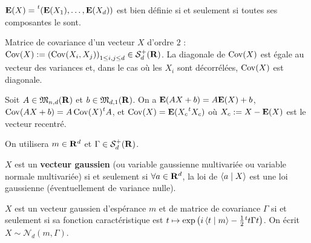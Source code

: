\begin{defn}
	$\esp(X) = \transp{(\esp(X_1),\ldots,\esp(X_d))}$ est bien définie si et seulement si toutes ses composantes le sont.
\end{defn}

\begin{defn}
	Matrice de covariance d'un vecteur $X$ d'ordre $2$ : $\operatorname{Cov}(X) := \left( \operatorname{Cov}(X_i,X_j) \right)_{1 \leq i,j \leq d} \in \mathcal{S}_d^+(\mathbf{R})$.
	La diagonale de $\operatorname{Cov}(X)$ est égale au vecteur des variances et, dans le cas où les $X_i$ sont décorrélées, $\operatorname{Cov}(X)$ est diagonale.
\end{defn}

\begin{pop}
	Soit $A \in \mathfrak{M}_{n,d}(\mathbf{R})$ et $b \in \mathfrak{M}_{d,1}(\mathbf{R})$.
	On a $\mathbf{E}(AX + b) = A \mathbf{E}(X) + b$, $\Cov(AX + b) = A \Cov(X) \transp{A}$, et $\Cov(X) = \esp(X_c \transp{X_c})$ où $X_c := X - \mathbf{E}(X)$ est le vecteur recentré.
\end{pop}

On utilisera $m \in \mathbf{R}^d$ et $\Gamma \in \mathcal{S}_d^+(\mathbf{R})$.

\begin{defn}
	$X$ est un \textbf{vecteur gaussien} (ou variable gaussienne multivariée ou variable normale multivariée) si et seulement si $\forall a \in \mathbf{R}^d$, la loi de $\left\langle a \mid X \right\rangle$ est une loi gaussienne (éventuellement de variance nulle).
\end{defn}

\begin{thm}
	$X$ est un vecteur gaussien d'espérance $m$ et de matrice de covariance $\Gamma$ si et seulement si sa fonction caractéristique est $t \mapsto \exp \left( i \scal{t}{m} - \frac{1}{2} \transp{t} \Gamma t \right)$.
	On écrit $X \sim \mathcal{N}_d(m,\Gamma)$.
\end{thm}
